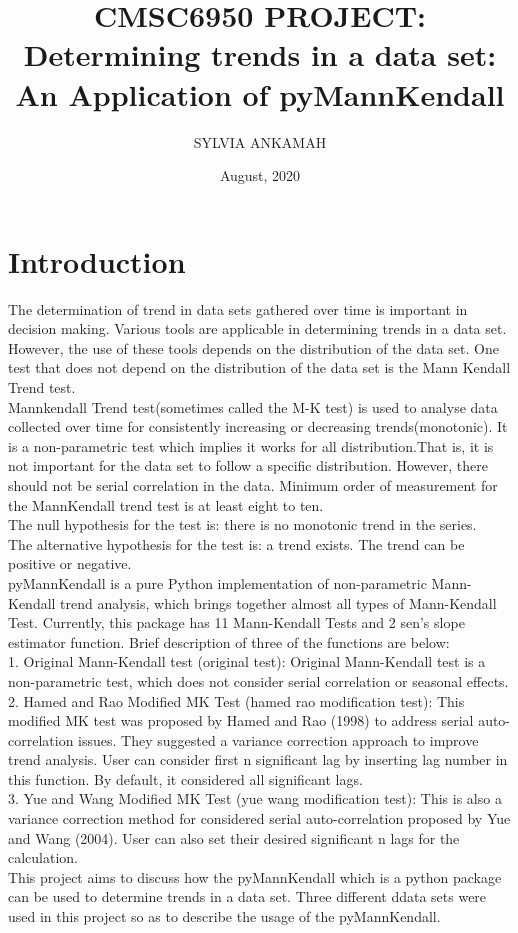 \documentclass[11]{article}
\title{CMSC6950 PROJECT: 
Determining trends in a data set: An Application of pyMannKendall}
\author{SYLVIA ANKAMAH}
\date{August, 2020}
\begin{document}
\maketitle
\section{Introduction}
The determination of trend in data sets gathered over time is important in decision making. Various tools are applicable in determining trends in a data set. However, the use of these tools depends on the distribution of the data set. One test that does not depend on the distribution of the data set is the Mann Kendall Trend test.\\Mannkendall Trend test(sometimes called the M-K test) is used to analyse data collected over time for consistently increasing or decreasing trends(monotonic). It is a non-parametric test which implies it works for all distribution.That is, it is not important for the data set to follow a specific distribution. However, there should not be serial correlation in the data. Minimum order of measurement for the MannKendall trend test is at least eight to ten. \\
The null hypothesis for the test is: there is no monotonic trend in the series.\\
The alternative hypothesis for the test is: a trend exists. The trend can be positive or negative.\\
pyMannKendall is a pure Python implementation of non-parametric Mann-Kendall trend analysis, which brings together almost all types of Mann-Kendall Test. Currently, this package has 11 Mann-Kendall Tests and 2 sen's slope estimator function. Brief description of three of the functions are below:\\
1. Original Mann-Kendall test (original test): Original Mann-Kendall test is a non-parametric test, which does not consider serial correlation or seasonal effects.\\
2. Hamed and Rao Modified MK Test (hamed rao modification test): This modified MK test was proposed by Hamed and Rao (1998) to address serial auto-correlation issues. They suggested a variance correction approach to improve trend analysis. User can consider first n significant lag by inserting lag number in this function. By default, it considered all significant lags.\\
3. Yue and Wang Modified MK Test (yue wang modification test): This is also a variance correction method for considered serial auto-correlation proposed by Yue and  Wang (2004). User can also set their desired significant n lags for the calculation.\\
This project aims to discuss how the pyMannKendall which is a python package can be used to determine trends in a data set. Three different ddata sets were used in this project so as to describe the usage of the pyMannKendall.\\
\end{document}
